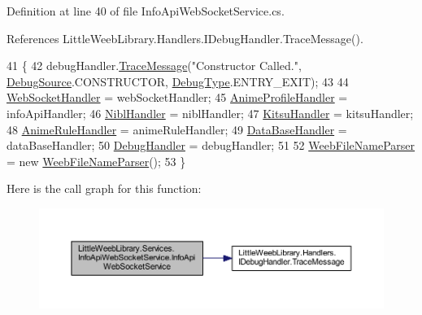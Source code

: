 Definition at line 40 of file Info\+Api\+Web\+Socket\+Service.\+cs.



References Little\+Weeb\+Library.\+Handlers.\+I\+Debug\+Handler.\+Trace\+Message().


\begin{DoxyCode}
41         \{
42             debugHandler.\mbox{\hyperlink{interface_little_weeb_library_1_1_handlers_1_1_i_debug_handler_a2e405bc3492e683cd3702fae125221bc}{TraceMessage}}(\textcolor{stringliteral}{"Constructor Called."}, 
      \mbox{\hyperlink{namespace_little_weeb_library_1_1_handlers_a2a6ca0775121c9c503d58aa254d292be}{DebugSource}}.CONSTRUCTOR, \mbox{\hyperlink{namespace_little_weeb_library_1_1_handlers_ab66019ed40462876ec4e61bb3ccb0a62}{DebugType}}.ENTRY\_EXIT);
43 
44             \mbox{\hyperlink{class_little_weeb_library_1_1_handlers_1_1_web_socket_handler}{WebSocketHandler}} = webSocketHandler;
45             \mbox{\hyperlink{class_little_weeb_library_1_1_handlers_1_1_anime_profile_handler}{AnimeProfileHandler}} = infoApiHandler;
46             \mbox{\hyperlink{class_little_weeb_library_1_1_handlers_1_1_nibl_handler}{NiblHandler}} = niblHandler;
47             \mbox{\hyperlink{class_little_weeb_library_1_1_handlers_1_1_kitsu_handler}{KitsuHandler}} = kitsuHandler;
48             \mbox{\hyperlink{class_little_weeb_library_1_1_handlers_1_1_anime_rule_handler}{AnimeRuleHandler}} = animeRuleHandler;
49             \mbox{\hyperlink{class_little_weeb_library_1_1_handlers_1_1_data_base_handler}{DataBaseHandler}} = dataBaseHandler;
50             \mbox{\hyperlink{class_little_weeb_library_1_1_handlers_1_1_debug_handler}{DebugHandler}} = debugHandler;
51 
52             \mbox{\hyperlink{class_little_weeb_library_1_1_services_1_1_info_api_web_socket_service_a87e98d408b1c2336a95736ac7bd416d4}{WeebFileNameParser}} = \textcolor{keyword}{new} \mbox{\hyperlink{class_little_weeb_library_1_1_services_1_1_info_api_web_socket_service_a87e98d408b1c2336a95736ac7bd416d4}{WeebFileNameParser}}();
53         \}
\end{DoxyCode}
Here is the call graph for this function\+:\nopagebreak
\begin{figure}[H]
\begin{center}
\leavevmode
\includegraphics[width=350pt]{class_little_weeb_library_1_1_services_1_1_info_api_web_socket_service_accba84b6333a0472f3acae2469ce5da3_cgraph}
\end{center}
\end{figure}


